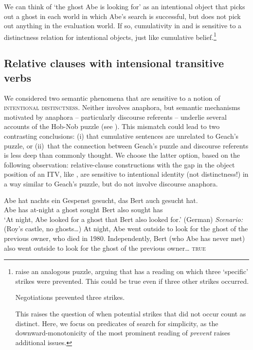 \documentclass[output=paper]{langscibook}
\begin{document}
\noindent We can think of `the ghost Abe is looking for' as an intentional object that picks out a ghost in each world in which Abe's search is successful, but does not pick out anything in the evaluation world. If so, cumulativity in  and  is sensitive to a distinctness relation for intentional objects, just like cumulative belief.\footnote{ \citet{Condoravdi:2001} raise an analogous puzzle, arguing that  has a reading on which three `specific' strikes were prevented. This could be true even if three other strikes occurred. 

\ea \label{sch-has:ex:13} Negotiations prevented three strikes. \hfill \citep[(2)]{Condoravdi:2001}\z

\noindent This raises the question of when potential strikes that did not occur count as distinct. Here, we focus on predicates of search for simplicity, as the downward-monotonicity of the most prominent reading of \textit{prevent} raises additional issues.}

\subsection{Relative clauses with intensional transitive verbs}

We considered two semantic phenomena that are sensitive to a notion of \textsc{intentional distinctness}. Neither involves anaphora, but semantic mechanisms motivated by anaphora -- particularly discourse referents -- underlie several accounts of the Hob-Nob puzzle (see ). This mismatch could lead to two  contrasting conclusions: (i) that cumulative sentences are unrelated to Geach's puzzle, or (ii)~that the connection between Geach's puzzle and discourse referents is less deep than commonly thought. We choose the latter option, based on the following observation: relative-clause constructions with the gap in the object position of an ITV, like , are sensitive to intentional identity (not distinctness!) in a way similar to Geach's puzzle, but do not involve discourse anaphora.

\eanoraggedright
\eanoraggedright \label{sch-has:ex:14} {\gll Abe hat nachts ein Gespenst gesucht, das Bert auch gesucht hat. \\
Abe has at-night a ghost sought \REL{} Bert also sought has \\
\glt `At night, Abe looked for a ghost that Bert also looked for.'} \hfill (German)
\ex \label{sch-has:ex:15} \textit{Scenario:} (Roy's castle, no ghosts\ldots) At night, Abe went outside to look for the ghost of the previous owner, who died in 1980. Independently, Bert (who Abe has never met) also went outside to look for the ghost of the previous owner\ldots \hfill {} \textsc{true}
\z\z
\end{document}
